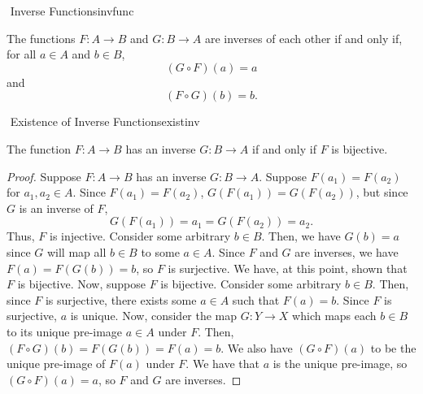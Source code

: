     \begin{definition}{\Stop\,\,Inverse Functions}{invfunc}

        The functions \(F:A\to B\) and \(G:B\to A\) are inverses of each other if and only if, for all \(a\in A\) and \(b\in B\),
        \begin{equation*}
            (G\circ F)(a)=a
        \end{equation*}
        and
        \begin{equation*}
            (F\circ G)(b)=b.
        \end{equation*}
        
    \end{definition}
    \pagebreak
    \begin{theorem}{\Stop\,\,Existence of Inverse Functions}{existinv}
        
        The function \(F:A\to B\) has an inverse \(G:B\to A\) if and only if \(F\) is bijective.
        \begin{proof}
            Suppose \(F:A\to B\) has an inverse \(G:B\to A\). Suppose \(F(a_1)=F(a_2)\) for \(a_1,a_2\in A\). Since \(F(a_1)=F(a_2)\), \(G(F(a_1))=G(F(a_2))\), but since \(G\) is an inverse of \(F\),
            \begin{equation*}
                G(F(a_1))=a_1=G(F(a_2))=a_2.
            \end{equation*}
            Thus, \(F\) is injective. Consider some arbitrary \(b\in B\). Then, we have \(G(b)=a\) since \(G\) will map all \(b\in B\) to some \(a\in A\). Since \(F\) and \(G\) are inverses, we have \(F(a)=F(G(b))=b\), so \(F\) is surjective. We have, at this point, shown that \(F\) is bijective. Now, suppose \(F\) is bijective. Consider some arbitrary \(b\in B\). Then, since \(F\) is surjective, there exists some \(a\in A\) such that \(F(a)=b\). Since \(F\) is surjective, \(a\) is unique. Now, consider the map \(G:Y\to X\) which maps each \(b\in B\) to its unique pre-image \(a\in A\) under \(F\). Then, \((F\circ G)(b)=F(G(b))=F(a)=b\). We also have \((G\circ F)(a)\) to be the unique pre-image of \(F(a)\) under \(F\). We have that \(a\) is the unique pre-image, so \((G\circ F)(a)=a\), so \(F\) and \(G\) are inverses. 
        \end{proof}

    \end{theorem}
